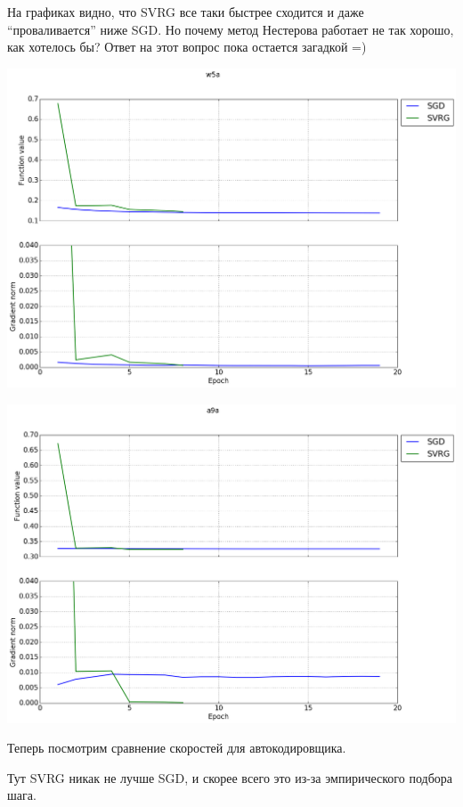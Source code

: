 \documentclass[12pt, a4paper]{article}
\begin{document}
    На графиках видно, что SVRG все таки быстрее сходится и даже ``проваливается'' ниже SGD. Но почему метод Нестерова работает не так хорошо, как хотелось бы?
    Ответ на этот вопрос пока остается загадкой =)
    \begin{center}\includegraphics[width=\picwidth]{cmp_w5a_fix_step.png}\end{center}
    \begin{center}\includegraphics[width=\picwidth]{cmp_a9a_fix_step.png}\end{center}

    Теперь посмотрим сравнение скоростей для автокодировщика.

    Тут SVRG никак не лучше SGD, и скорее всего это из-за эмпирического подбора шага.
\end{document}

